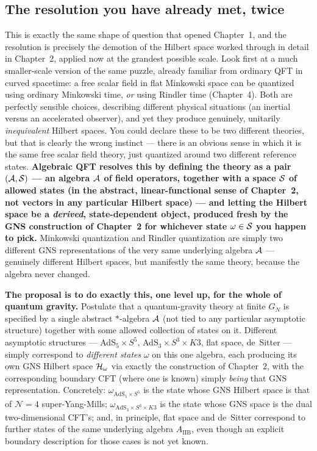 \subsection*{The resolution you have already met, twice}

This is exactly the same shape of question that opened Chapter~1, and the resolution is precisely the demotion
of the Hilbert space worked through in detail in Chapter~2, applied now at the grandest possible scale. Look
first at a much smaller-scale version of the same puzzle, already familiar from ordinary QFT in curved
spacetime: a free scalar field in flat Minkowski space can be quantized using ordinary Minkowski time,
\emph{or} using Rindler time (Chapter~4). Both are perfectly sensible choices, describing different physical
situations (an inertial versus an accelerated observer), and yet they produce genuinely, unitarily
\emph{inequivalent} Hilbert spaces. You could declare these to be two different theories, but that is clearly
the wrong instinct — there is an obvious sense in which it is the same free scalar field theory, just quantized
around two different reference states. \textbf{Algebraic QFT resolves this by defining the theory as a pair
$(\mathcal{A},\mathcal{S})$ — an algebra $\mathcal{A}$ of field operators, together with a space $\mathcal{S}$ of allowed states (in the
abstract, linear-functional sense of Chapter~2, not vectors in any particular Hilbert space) — and letting the
Hilbert space be a \emph{derived}, state-dependent object, produced fresh by the GNS construction of Chapter~2
for whichever state $\omega\in\mathcal{S}$ you happen to pick.} Minkowski quantization and Rindler quantization are
simply two different GNS representations of the very same underlying algebra $\mathcal{A}$ — genuinely different
Hilbert spaces, but manifestly the same theory, because the algebra never changed.

\textbf{The proposal is to do exactly this, one level up, for the whole of quantum gravity.} Postulate that a
quantum-gravity theory at finite $G_N$ is specified by a single abstract $*$-algebra $\mathcal{A}$ (not tied to any
particular asymptotic structure) together with some allowed collection of states on it. Different asymptotic
structures — AdS$_5\times S^5$, AdS$_3\times S^3\times K3$, flat space, de~Sitter — simply correspond to
\emph{different states} $\omega$ on this one algebra, each producing its own GNS Hilbert space $\mathcal{H}_\omega$ via
exactly the construction of Chapter~2, with the corresponding boundary CFT (where one is known) simply
\emph{being} that GNS representation. Concretely: $\omega_{\text{AdS}_5\times S^5}$ is the state whose GNS
Hilbert space is that of $\mathcal N=4$ super-Yang-Mills; $\omega_{\text{AdS}_3\times S^3\times K3}$ is the
state whose GNS space is the dual two-dimensional CFT's; and, in principle, flat space and de~Sitter correspond
to further states of the same underlying algebra $A_{\text{IIB}}$, even though an explicit boundary description
for those cases is not yet known.


